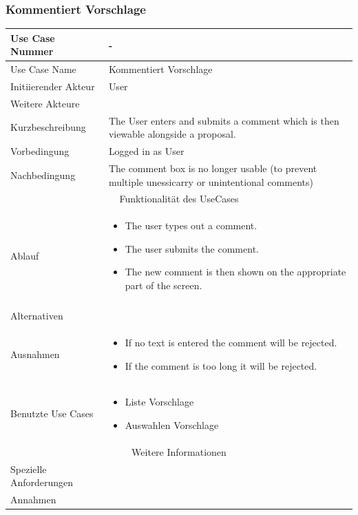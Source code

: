 \documentclass[10pt,a4paper]{article}
\begin{document}
	\subsubsection{Kommentiert Vorschlage}
	\begin{tabular}{|l|p{.5\linewidth}|}
	\hline Use Case Nummer & - \\ 
	\hline Use Case Name & Kommentiert Vorschlage \\ 
	\hline Initiierender Akteur & User \\
	\hline Weitere Akteure & \\
	\hline Kurzbeschreibung & The User enters and submits a comment which is then viewable alongside a proposal. \\
	\hline Vorbedingung & Logged in as User \\
	\hline Nachbedingung & The comment box is no longer usable (to prevent multiple unessicarry or unintentional comments) \\
	\hline \multicolumn{2}{|c|}{Funktionalität des UseCases}\\
	\hline Ablauf & \begin{itemize}
			\item The user types out a comment.
			\item The user submits the comment.
			\item The new comment is then shown on the appropriate part of the screen.
		\end{itemize} \\ \\
	\hline Alternativen &  \\
	\hline Ausnahmen & \begin{itemize}
			\item If no text is entered the comment will be rejected.
			\item If the comment is too long it will be rejected.
		\end{itemize} \\
	\hline Benutzte Use Cases & \begin{itemize}
			\item Liste Vorschlage
			\item Auswahlen Vorschlage
		\end{itemize} \\
	\hline \multicolumn{2}{|c|}{Weitere Informationen} \\
	\hline Spezielle Anforderungen &  \\
	\hline Annahmen &  \\
	\hline
	\end{tabular}
\end{document}
